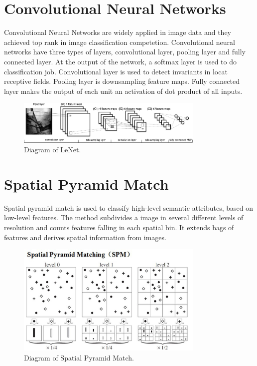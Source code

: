 \section{Convolutional Neural Networks}

Convolutional Neural Networks\citep{lecun1998gradient} are widely applied in image data and they achieved top rank in image classification competetion\citep{krizhevsky2012imagenet}. Convolutional neural networks have three types of layers, convolutional layer, pooling layer and fully connected layer. At the output of the network, a softmax layer is used to do classification job.  Convolutional layer is used to detect invariants in locat receptive fields. Pooling layer is downsampling feature maps. Fully connected layer makes the output of each unit an activation of dot product of all inputs.

\graphicspath{ {./Figures/} }
\begin{figure}[!htb]
\centering
\includegraphics[width=0.8\textwidth]{lenet.png}
\caption{\label{fig:perceptron}Diagram of LeNet.}
\end{figure}

\section{Spatial Pyramid Match}

Spatial pyramid match\citep{lazebnik2006beyond} is used to classify high-level semantic attributes, based on low-level features. The method subdivides a image in several different levels of resolution and counts features falling in each spatial bin. It extends bags of features and derives spatial information from images.
\graphicspath{ {./Figures/} }
\begin{figure}[!htb]
\centering
\includegraphics[width=0.8\textwidth]{spm.jpg}
\caption{\label{fig:perceptron}Diagram of Spatial Pyramid Match.}
\end{figure}

